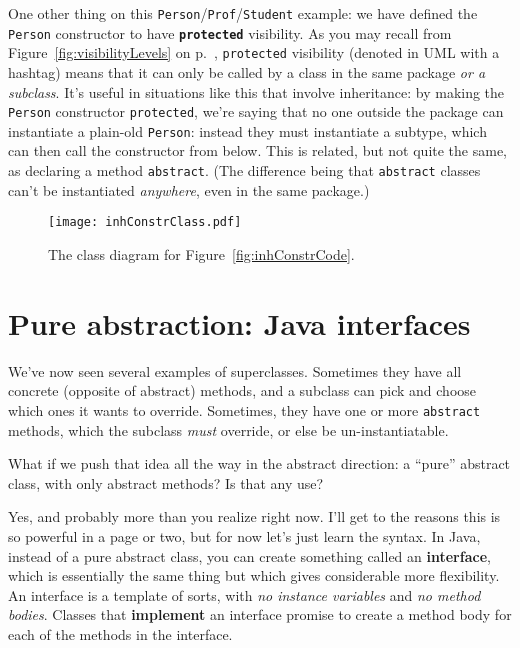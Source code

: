 One other thing on this \texttt{Person}/\texttt{Prof}/\texttt{Student}
example: we have defined the \texttt{Person} constructor to have
\textbf{\texttt{protected}} visibility. As you may recall from
Figure~\ref{fig:visibilityLevels} on p.~\pageref{fig:visibilityLevels},
\texttt{protected} visibility (denoted in UML with a hashtag) means that it
can only be called by a class in the same package \textit{or a subclass}. It's
useful in situations like this that involve inheritance: by making the
\texttt{Person} constructor \texttt{protected}, we're saying that no one
outside the package can instantiate a plain-old \texttt{Person}: instead they
must instantiate a subtype, which can then call the constructor from below.
This is related, but not quite the same, as declaring a method
\texttt{abstract}. (The difference being that \texttt{abstract} classes can't
be instantiated \textit{anywhere}, even in the same package.)

\begin{figure}
\centering
\texttt{[image: inhConstrClass.pdf]}
\caption{The class diagram for Figure~\ref{fig:inhConstrCode}.}
\label{fig:inhConstrClass}
\end{figure}


\section{Pure abstraction: Java interfaces}
\label{sec:interfaces}

We've now seen several examples of superclasses. Sometimes they have all
concrete (opposite of abstract) methods, and a subclass can pick and choose
which ones it wants to override. Sometimes, they have one or more
\texttt{abstract} methods, which the subclass \textit{must} override, or else
be un-instantiatable.

What if we push that idea all the way in the abstract direction: a ``pure''
abstract class, with only abstract methods? Is that any use?

Yes, and probably more than you realize right now. I'll get to the reasons
this is so powerful in a page or two, but for now let's just learn the syntax.
In Java, instead of a pure abstract class, you can create something called an
\textbf{interface}, which is essentially the same thing but which gives
considerable more flexibility. An interface is a template of sorts, with
\textit{no instance variables} and \textit{no method bodies}. Classes that
\textbf{implement} an interface promise to create a method body for each of
the methods in the interface.

